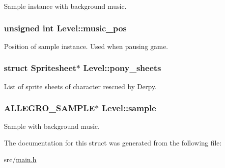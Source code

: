 \-Sample instance with background music. \hypertarget{structLevel_a13e322deb3298846260af31324e5b492}{
\subsubsection[{music\-\_\-pos}]{\setlength{\rightskip}{0pt plus 5cm}unsigned int {\bf \-Level\-::music\-\_\-pos}}}\label{structLevel_a13e322deb3298846260af31324e5b492}
\-Position of sample instance. \-Used when pausing game. \hypertarget{structLevel_a591b830752cc796a306e96166f736e3b}{
\subsubsection[{pony\-\_\-sheets}]{\setlength{\rightskip}{0pt plus 5cm}struct {\bf \-Spritesheet}$\ast$ {\bf \-Level\-::pony\-\_\-sheets}}}\label{structLevel_a591b830752cc796a306e96166f736e3b}
\-List of sprite sheets of character rescued by \-Derpy. \hypertarget{structLevel_a234fa7b9ec35dd360e4e3c48a944fc7d}{
\subsubsection[{sample}]{\setlength{\rightskip}{0pt plus 5cm}\-A\-L\-L\-E\-G\-R\-O\-\_\-\-S\-A\-M\-P\-L\-E$\ast$ {\bf \-Level\-::sample}}}\label{structLevel_a234fa7b9ec35dd360e4e3c48a944fc7d}
\-Sample with background music. 

\-The documentation for this struct was generated from the following file\-:\begin{DoxyCompactItemize}
\item 
src/\hyperlink{main_8h}{main.\-h}\end{DoxyCompactItemize}
